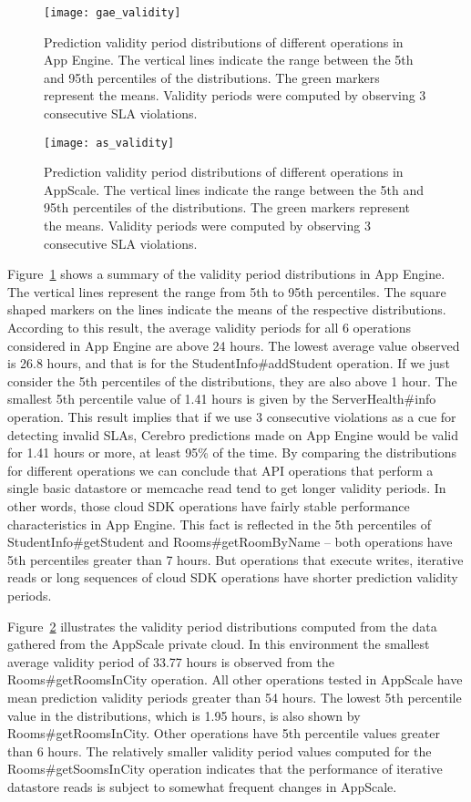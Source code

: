 \begin{figure}
\centering
\texttt{[image: gae\_validity]}
\caption{Prediction validity period distributions of different operations in App Engine. The vertical lines indicate the range between the 5th and 95th percentiles of the distributions. The green markers represent the means. Validity periods were computed by observing 3 consecutive SLA
violations.}
\label{fig:gae_validity}
\end{figure}

\begin{figure}
\centering
\texttt{[image: as\_validity]}
\caption{Prediction validity period distributions of different operations in AppScale. The vertical lines indicate the range between the 5th and 95th percentiles of the distributions. The green markers represent the means. Validity periods were computed by observing 3 consecutive SLA
violations.}
\label{fig:as_validity}
\end{figure}

Figure~\ref{fig:gae_validity} shows a summary of the validity period distributions in App Engine. The
vertical lines represent the range from 5th to 95th percentiles. The square shaped markers on the lines indicate the means of the
respective distributions. According to this result, the average validity periods for all 6 operations considered in App Engine are
above 24 hours. The lowest average value observed is 26.8 hours, and that is for the StudentInfo\#addStudent operation. If we
just consider the 5th percentiles of the distributions, they are also above 1 hour. The smallest 5th percentile value of 1.41 hours is 
given by the ServerHealth\#info operation. This result implies that if we use 3 consecutive violations as a cue for detecting invalid SLAs,
Cerebro predictions made on App Engine would be valid for 1.41 hours or more, at least 95\% of the time.
By comparing the distributions for different operations we can conclude that API operations that perform a single basic datastore or
memcache read tend to get longer validity periods. In other words, those cloud SDK operations have fairly stable performance
characteristics in App Engine. This fact is reflected in the 5th percentiles of StudentInfo\#getStudent and
Rooms\#getRoomByName -- both operations have 5th percentiles greater than 7 hours. But operations that execute writes, iterative
reads or long sequences of cloud SDK operations have shorter prediction validity periods.

Figure~\ref{fig:as_validity} illustrates the validity period distributions computed from the data gathered from
the AppScale private cloud. In this environment the smallest average validity period of 33.77 hours is observed from the
Rooms\#getRoomsInCity operation. All other operations tested in AppScale have mean prediction validity periods greater
than 54 hours. The lowest 5th percentile value in the distributions, which is 1.95 hours, is also shown by Rooms\#getRoomsInCity.
Other operations have 5th percentile values greater than 6 hours. The relatively smaller validity period values computed for the
Rooms\#getSoomsInCity operation indicates that the performance of iterative datastore reads is subject to somewhat frequent changes 
in AppScale.

